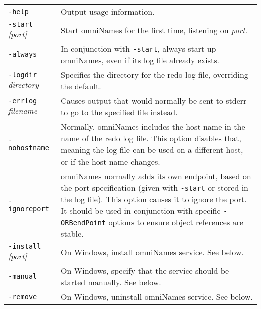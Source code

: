 \documentclass[a4paper,11pt,twoside]{article}
\newcommand{\cmdline}[1]{\texttt{#1}}
\begin{document}
\begin{tabular}{lp{}}

\cmdline{-help} &
    Output usage information.\\[.5\baselineskip]

\cmdline{-start }\textit{[port]} &
    Start omniNames for the first time, listening on
    \textit{port}.\\[.5\baselineskip]

\cmdline{-always} &
    In conjunction with \cmdline{-start}, always start up
    omniNames, even if its log file already exists.\\[.5\baselineskip]

\cmdline{-logdir }\textit{directory} &
    Specifies the directory for the redo log file, overriding the
    default.\\[.5\baselineskip]

\cmdline{-errlog }\textit{filename} &
    Causes output that would normally be sent to stderr to go to the
    specified file instead.\\[.5\baselineskip]

\cmdline{-nohostname} &
    Normally, omniNames includes the host name in the name of the redo
    log file. This option disables that, meaning the log file can be
    used on a different host, or if the host name
    changes.\\[.5\baselineskip]

\cmdline{-ignoreport} &
    omniNames normally adds its own endpoint, based on the port
    specification (given with \cmdline{-start} or stored in the log
    file). This option causes it to ignore the port. It should be used
    in conjunction with specific \cmdline{-ORBendPoint} options to
    ensure object references are stable.\\[.5\baselineskip]

\cmdline{-install }\textit{[port]} &
    On Windows, install omniNames service. See below.\\[.5\baselineskip]

\cmdline{-manual} &
    On Windows, specify that the service should be started
    manually. See below.\\[.5\baselineskip]

\cmdline{-remove} &
    On Windows, uninstall omniNames service. See below.\\[.5\baselineskip]

\end{tabular}
\end{document}
